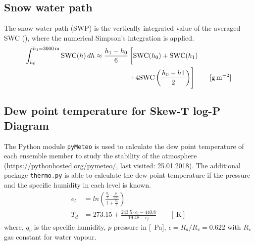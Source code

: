 \subsection{Snow water path}
The snow water path (SWP) is the vertically integrated value of the averaged SWC (), where the numerical Simpson's integration is applied.  
\begin{equation}
	\begin{split}
		\int_{h_0}^{h_1=\SI{3000}{\metre}} \text{SWC}(h) \, dh \approx 
		\frac{h_1 - h_0}{6}  & \left[ \text{SWC}(h_0)    + \text{SWC}(h_1)   \vphantom{\frac{h_0 + h1}{2}} \right. \\ 
		& \left. + 4 \text{SWC}\left(\frac{h_0 + h1}{2}\right)  
		\right] \qquad [\SI{}{\g\per\square\meter}]
	\end{split}
	\label{eq:chi}
\end{equation}




\subsection{Dew point temperature for Skew-T log-P Diagram}
The Python module \texttt{pyMeteo} is used to calculate the dew point temperature of each ensemble member to study the stability of the atmosphere (\url{https://pythonhosted.org/pymeteo/}, last visited: 25.01.2018). The additional package \texttt{thermo.py} is able to calculate the dew point temperature if the pressure and the specific humidity in each level is known. 
\begin{align}
	e_l & = ln\left( \frac{\frac{q_v}{\epsilon} \cdot \frac{p}{100}}{1 + \frac{q_v}{\epsilon}} \right) \\
	T_d & = 273.15 + \frac{243.5 \cdot e_l -440.8}{19.48 -e_l} \qquad [\SI{}{\kelvin}]
\end{align}
where, $q_v$ is the specific humidity, $p$ pressure in [\SI{}{\Pa}], $\epsilon = R_d / R_v = 0.622$ with $R_v$ gas constant for water vapour.